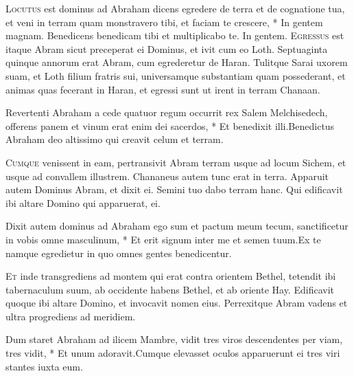 \begin{multicols*}{2}
\lettrine[lines=2]{\zallmancaps \color{Red} L}{ocutus} \hypertarget{locutus-est}{\label{locutus-est}} est dominus ad Abraham dicens egredere de terra et de cognatione tua, et veni in terram quam monstravero tibi, et faciam te crescere, * In gentem magnam. \V Benedicens benedicam tibi et multiplicabo te. In gentem.
\lettrine[lines=2]{\zallmancaps \color{Blue} E}{gressus} est itaque Abram sicut preceperat ei Dominus, et ivit cum eo Loth. Septuaginta quinque annorum erat Abram, cum egrederetur de Haran. Tulitque Sarai uxorem suam, et Loth filium fratris sui, universamque substantiam quam possederant, et animas quas fecerant in Haran, et egressi sunt ut irent in terram Chanaan.
\begin{responsory}
{Revertenti Abraham a cede quatuor regum occurrit rex Salem Melchisedech, offerens panem et vinum erat enim dei sacerdos, * Et benedixit illi.}{Benedictus Abraham deo altissimo qui creavit celum et terram.}
\end{responsory}
\lettrine[lines=2]{\zallmancaps \color{Red} C}{umque} venissent in eam, pertransivit Abram terram usque ad locum Sichem, et usque ad convallem illustrem. Chananeus autem tunc erat in terra. Apparuit autem Dominus Abram, et dixit ei. Semini tuo dabo terram hanc. Qui edificavit ibi altare Domino qui apparuerat, ei.
\begin{responsory-doxology}
{Dixit autem dominus ad Abraham ego sum et pactum meum tecum, sanctificetur in vobis omne masculinum, * Et erit signum inter me et semen tuum.}{Ex te namque egredietur in quo omnes gentes benedicentur.}
\end{responsory-doxology}
\lettrine[lines=2]{\zallmancaps \color{Blue} E}{t} inde transgrediens ad montem qui erat contra orientem Bethel, tetendit ibi tabernaculum suum, ab occidente habens Bethel, et ab oriente Hay. Edificavit quoque ibi altare Domino, et invocavit nomen eius. Perrexitque Abram vadens et ultra progrediens ad meridiem.
\begin{responsory}
{Dum staret Abraham ad ilicem Mambre, vidit tres viros descendentes per viam, tres vidit, * Et unum adoravit.}{Cumque elevasset oculos apparuerunt ei tres viri stantes iuxta eum.}
\end{responsory}

\end{multicols*}
